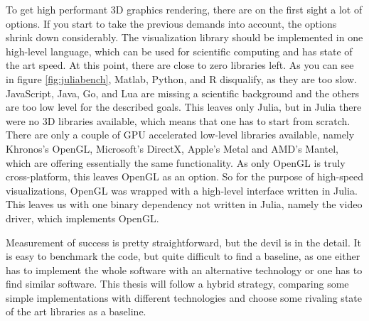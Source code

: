 To get high performant 3D graphics rendering, there are on the first sight a lot of options.
If you start to take the previous demands into account, the options shrink down considerably.
The visualization library should be implemented in one high-level language, which can be used for scientific computing and has state of the art speed. 
At this point, there are close to zero libraries left. As you can see in figure \ref{fig:juliabench}, Matlab, Python, and R disqualify, as they are too slow. JavaScript, Java, Go, and Lua are missing a scientific background and the others are too low level for the described goals.
This leaves only Julia, but in Julia there were no 3D libraries available, which means that one has to start from scratch.
There are only a couple of GPU accelerated low-level libraries available, namely Khronos's \ac{OpenGL}, Microsoft's DirectX, Apple's Metal and AMD's Mantel, which are offering essentially the same functionality. 
As only \ac{OpenGL} is truly cross-platform, this leaves \ac{OpenGL} as an option.
So for the purpose of high-speed visualizations, \ac{OpenGL} was wrapped with a high-level interface written in Julia. This leaves us with one binary dependency not written in Julia, namely the video driver, which implements \ac{OpenGL}.

Measurement of success is pretty straightforward, but the devil is in the detail.
It is easy to benchmark the code, but quite difficult to find a baseline, as one either has to implement the whole software with an alternative technology or one has to find similar software.
This thesis will follow a hybrid strategy, comparing some simple implementations with different technologies and choose some rivaling state of the art libraries as a baseline.

